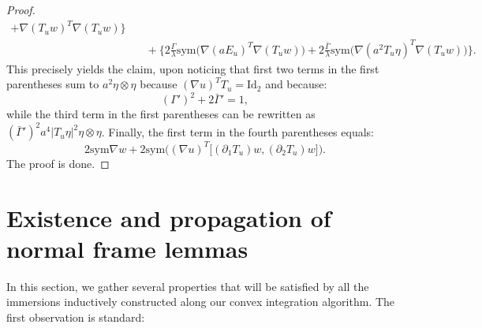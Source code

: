 \documentclass[reqno,twoside,11pt]{amsart}
\newcommand{\sym}{\mathrm{sym}}
\newcommand{\Id}{\mathrm{Id}}
\numberwithin{equation}{section}
\theoremstyle{plain}
\theoremstyle{definition}
\begin{document}
\begin{proof}
\begin{equation*}
\begin{split}
+ \nabla(T_uw)^T\nabla(T_uw)\Big\}
\\ & \quad + \Big\{2\frac{\Gamma}{\lambda} \sym\big(\nabla(a E_u)^T \nabla(T_uw)\big) 
+ 2\frac{\bar\Gamma}{\lambda} \sym\big(\nabla(a^2 T_u\eta)^T \nabla(T_uw)\big)\}. 
\end{split}
\end{equation*}
This precisely yields the claim, upon noticing that first two terms in
the first parentheses sum to $a^2\eta\otimes\eta$ because 
$(\nabla u)^T T_u=\Id_2$ and because: 
$$(\Gamma')^2+2\bar\Gamma' = 1,$$ 
while the third term in the first parentheses can be rewritten as $(\bar\Gamma')^2a^4
|T_u\eta|^2\eta\otimes\eta$. Finally, the first term in the fourth parentheses equals:
$$2\sym\nabla w + 2\sym\big((\nabla u)^T\big[(\partial_1 T_u)w, (\partial_2 T_u)w\big]\big).$$ 
The proof is done.
\end{proof}

\section{Existence and propagation of normal frame lemmas}\label{sec_normals}

In this section, we gather several properties that will be satisfied by all
the immersions inductively constructed along our convex integration algorithm. 
The first observation is standard:
\end{document}
